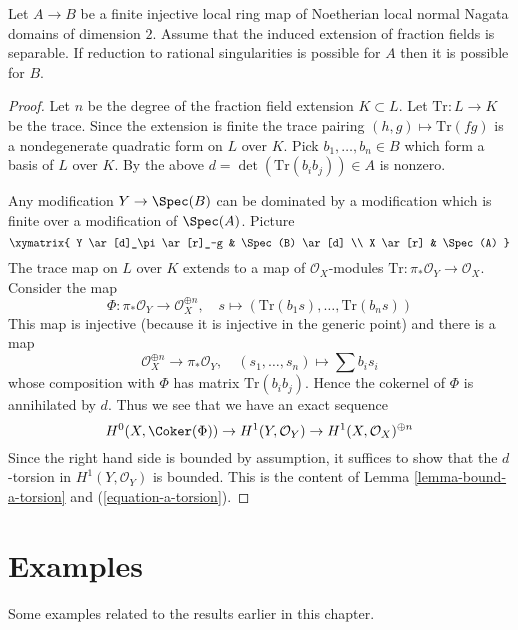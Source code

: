 \begin{lemma}
\label{lemma-go-up-separable}
Let $A \to B$ be a finite injective local ring map of Noetherian local normal
Nagata domains of dimension $2$. Assume that the induced extension of
fraction fields is separable. If reduction to rational singularities
is possible for $A$ then it is possible for $B$.
\end{lemma}

\begin{proof}
Let $n$ be the degree of the fraction field extension $K \subset L$.
Let $\text{Tr} : L \to K$ be the trace. Since the extension is finite
the trace pairing $(h, g) \mapsto \text{Tr}(fg)$ is a nondegenerate
quadratic form on $L$ over $K$.
Pick $b_1, \ldots, b_n \in B$ which form a basis of $L$ over $K$.
By the above $d = \det(\text{Tr}(b_ib_j)) \in A$ is nonzero.

\medskip\noindent
Any modification $Y \to \Spec(B)$ can be dominated by a modification
which is finite over a modification of $\Spec(A)$. Picture
$$
\xymatrix{
Y \ar[d]_\pi \ar[r]_-g & \Spec(B) \ar[d] \\
X \ar[r] & \Spec(A)
}
$$
The trace map on $L$ over $K$ extends to a map of $\mathcal{O}_X$-modules
$\text{Tr} : \pi_*\mathcal{O}_Y \to \mathcal{O}_X$. Consider the map
$$
\Phi : \pi_*\mathcal{O}_Y \longrightarrow \mathcal{O}_X^{\oplus n},\quad
s \longmapsto (\text{Tr}(b_1s), \ldots, \text{Tr}(b_ns))
$$
This map is injective (because it is injective in the generic point)
and there is a map
$$
\mathcal{O}_X^{\oplus n} \longrightarrow \pi_*\mathcal{O}_Y,\quad
(s_1, \ldots, s_n) \longmapsto \sum b_i s_i
$$
whose composition with $\Phi$ has matrix $\text{Tr}(b_ib_j)$.
Hence the cokernel of $\Phi$ is annihilated by $d$. Thus we see that
we have an exact sequence
$$
H^0(X, \Coker(\Phi)) \to H^1(Y, \mathcal{O}_Y) \to
H^1(X, \mathcal{O}_X)^{\oplus n}
$$
Since the right hand side is bounded by assumption, it suffices to show
that the $d$-torsion in $H^1(Y, \mathcal{O}_Y)$ is bounded.
This is the content of Lemma \ref{lemma-bound-a-torsion} and
(\ref{equation-a-torsion}).
\end{proof}








\section{Examples}
\label{section-examples}

\noindent
Some examples related to the results earlier in this chapter.


